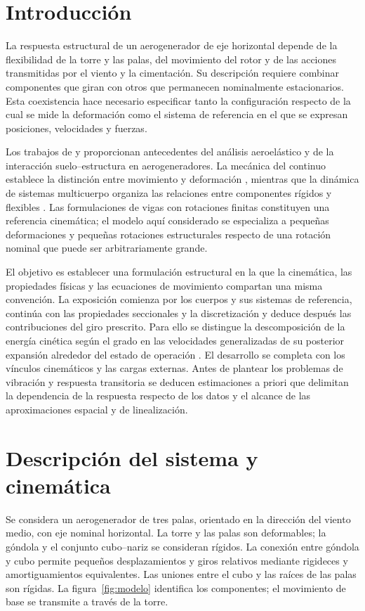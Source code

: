 \section{Introducción}
La respuesta estructural de un aerogenerador de eje horizontal depende de la flexibilidad de la torre y las palas, del movimiento del rotor y de las acciones transmitidas por el viento y la cimentación. Su descripción requiere combinar componentes que giran con otros que permanecen nominalmente estacionarios. Esta coexistencia hace necesario especificar tanto la configuración respecto de la cual se mide la deformación como el sistema de referencia en el que se expresan posiciones, velocidades y fuerzas.

Los trabajos de \citet{maza2014} y \citet{turello2023} proporcionan antecedentes del análisis aeroelástico y de la interacción suelo--estructura en aerogeneradores. La mecánica del continuo establece la distinción entre movimiento y deformación \citep{holzapfel2000}, mientras que la dinámica de sistemas multicuerpo organiza las relaciones entre componentes rígidos y flexibles \citep{shabana2013}. Las formulaciones de vigas con rotaciones finitas \citep{simo1985} constituyen una referencia cinemática; el modelo aquí considerado se especializa a pequeñas deformaciones y pequeñas rotaciones estructurales respecto de una rotación nominal que puede ser arbitrariamente grande.

El objetivo es establecer una formulación estructural en la que la cinemática, las propiedades físicas y las ecuaciones de movimiento compartan una misma convención. La exposición comienza por los cuerpos y sus sistemas de referencia, continúa con las propiedades seccionales y la discretización y deduce después las contribuciones del giro prescrito. Para ello se distingue la descomposición de la energía cinética según el grado en las velocidades generalizadas de su posterior expansión alrededor del estado de operación \citep{meirovitch1997}. El desarrollo se completa con los vínculos cinemáticos y las cargas externas. Antes de plantear los problemas de vibración y respuesta transitoria se deducen estimaciones a priori que delimitan la dependencia de la respuesta respecto de los datos y el alcance de las aproximaciones espacial y de linealización.

\section{Descripción del sistema y cinemática}
\label{sec:cinematica}
Se considera un aerogenerador de tres palas, orientado en la dirección del viento medio, con eje nominal horizontal. La torre y las palas son deformables; la góndola y el conjunto cubo--nariz se consideran rígidos. La conexión entre góndola y cubo permite pequeños desplazamientos y giros relativos mediante rigideces y amortiguamientos equivalentes. Las uniones entre el cubo y las raíces de las palas son rígidas. La figura~\ref{fig:modelo} identifica los componentes; el movimiento de base se transmite a través de la torre.

